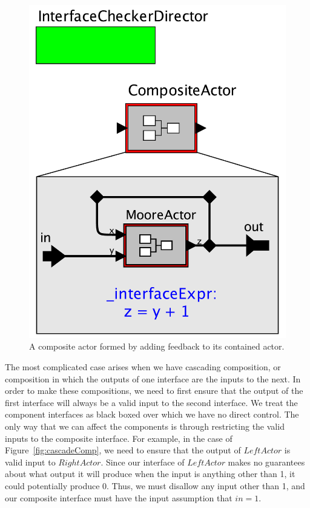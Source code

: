 \documentclass[preprint,11pt]{sigplanconf}
\begin{document}
\begin{figure}[htbp]
\centering %
\includegraphics[width=\columnwidth]{figs/feedbackComp}
\caption{A composite actor formed by adding feedback to its contained actor.}
\label{fig:feedbackComp}
\end{figure}

The most complicated case arises when we have cascading composition, or
composition in which the outputs of one interface are the inputs to the next.
In order to make these compositions, we need to first ensure that the output of
the first interface will always be a valid input to the second interface.  We
treat the component interfaces as black boxed over which we have no direct
control.  The only way that we can affect the components is through restricting
the valid inputs to the composite interface.
%
For example, in the case of Figure~\ref{fig:cascadeComp}, we need to ensure
that the output of $LeftActor$ is valid input to $RightActor$.  Since our
interface of $LeftActor$ makes no guarantees about what output it will produce
when the input is anything other than 1, it could potentially produce 0. Thus,
we must disallow any input other than 1, and our composite interface must have
the input assumption that $in = 1$.
\end{document}
